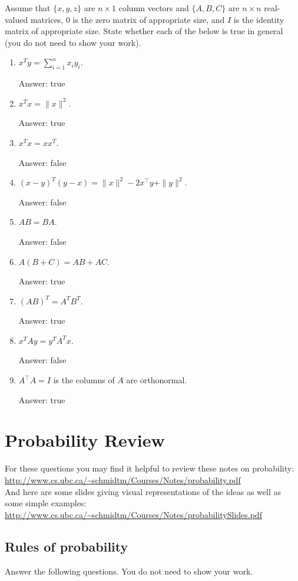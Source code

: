 \documentclass{article}
\def\ans#1{\par\gre{Answer: #1}}
\def\blu#1{{\color{blu}#1}}
\def\gre#1{{\color{gre}#1}}
\def\norm#1{\|#1\|}
\begin{document}
Assume that $\{x,y,z\}$ are $n \times 1$ column vectors and $\{A,B,C\}$ are $n \times n$ real-valued matrices, $0$ is the zero matrix of appropriate size, and $I$ is the identity matrix of appropriate size. \blu{State whether each of the below is true in general} (you do not need to show your work).

\begin{enumerate}
\item $x^Ty = \sum_{i=1}^n x_iy_i$. \ans{true}
\item $x^Tx = \norm{x}^2$. \ans{true}
\item $x^Tx = xx^T$.  \ans{false}
\item $(x-y)^T(y-x) = \norm{x}^2 - 2x^\top y + \norm{y}^2$. \ans{false}
\item $AB=BA$. \ans{false}
\item $A(B + C) = AB + AC$. \ans{true}
\item $(AB)^T = A^TB^T$. \ans{true}
\item $x^TAy = y^TA^Tx$. \ans{false}
\item $A^\top A = I$ is the columns of $A$ are orthonormal. \ans{true}
\end{enumerate}


\section{Probability Review}


For these questions you may find it helpful to review these notes on probability:\\
\url{http://www.cs.ubc.ca/~schmidtm/Courses/Notes/probability.pdf}\\
And here are some slides giving visual representations of the ideas as well as some simple examples:\\
\url{http://www.cs.ubc.ca/~schmidtm/Courses/Notes/probabilitySlides.pdf}

\subsection{Rules of probability}

\blu{Answer the following questions.} You do not need to show your work.
\end{document}
